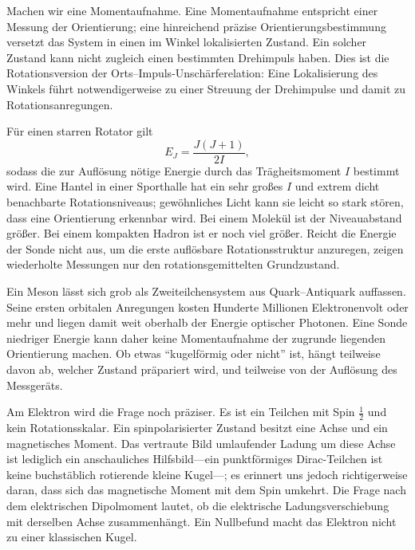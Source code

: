 Machen wir eine Momentaufnahme. Eine Momentaufnahme entspricht einer Messung der Orientierung; eine hinreichend präzise Orientierungsbestimmung versetzt das System in einen im Winkel lokalisierten Zustand. Ein solcher Zustand kann nicht zugleich einen bestimmten Drehimpuls haben. Dies ist die Rotationsversion der Orts--Impuls-Unschärferelation: Eine Lokalisierung des Winkels führt notwendigerweise zu einer Streuung der Drehimpulse und damit zu Rotationsanregungen.

Für einen starren Rotator gilt
\begin{equation}
E_J=\frac{J(J+1)}{2I},
\end{equation}
sodass die zur Auflösung nötige Energie durch das Trägheitsmoment \(I\) bestimmt wird. Eine Hantel in einer Sporthalle hat ein sehr großes \(I\) und extrem dicht benachbarte Rotationsniveaus; gewöhnliches Licht kann sie leicht so stark stören, dass eine Orientierung erkennbar wird. Bei einem Molekül ist der Niveauabstand größer. Bei einem kompakten Hadron ist er noch viel größer. Reicht die Energie der Sonde nicht aus, um die erste auflösbare Rotationsstruktur anzuregen, zeigen wiederholte Messungen nur den rotationsgemittelten Grundzustand.

Ein Meson lässt sich grob als Zweiteilchensystem aus Quark--Antiquark auffassen. Seine ersten orbitalen Anregungen kosten Hunderte Millionen Elektronenvolt oder mehr und liegen damit weit oberhalb der Energie optischer Photonen. Eine Sonde niedriger Energie kann daher keine Momentaufnahme der zugrunde liegenden Orientierung machen. Ob etwas ``kugelförmig oder nicht'' ist, hängt teilweise davon ab, welcher Zustand präpariert wird, und teilweise von der Auflösung des Messgeräts.

Am Elektron wird die Frage noch präziser. Es ist ein Teilchen mit Spin \(\tfrac12\) und kein Rotationsskalar. Ein spinpolarisierter Zustand besitzt eine Achse und ein magnetisches Moment. Das vertraute Bild umlaufender Ladung um diese Achse ist lediglich ein anschauliches Hilfsbild---ein punktförmiges Dirac-Teilchen ist keine buchstäblich rotierende kleine Kugel---; es erinnert uns jedoch richtigerweise daran, dass sich das magnetische Moment mit dem Spin umkehrt. Die Frage nach dem elektrischen Dipolmoment lautet, ob die elektrische Ladungsverschiebung mit derselben Achse zusammenhängt. Ein Nullbefund macht das Elektron nicht zu einer klassischen Kugel.

\begin{classroomqa}
\end{classroomqa}

